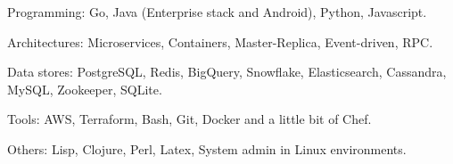 \begin{rlist}
  \item Programming: Go, Java (Enterprise stack and Android), Python, Javascript.
  \item Architectures: Microservices, Containers, Master-Replica, Event-driven, RPC.
  \item Data stores: PostgreSQL, Redis, BigQuery, Snowflake, Elasticsearch, Cassandra, MySQL, Zookeeper, SQLite.
  \item Tools: AWS, Terraform, Bash, Git, Docker and a little bit of Chef.
  \item Others: Lisp, Clojure, Perl, Latex, System admin in Linux environments.
\end{rlist}

